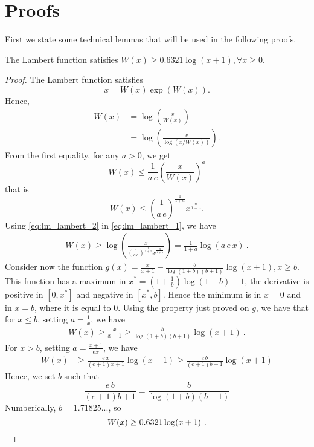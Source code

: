 \appendix
\section{Proofs}
\label{sec:proofs}

First we state some technical lemmas that will be used in the following proofs.

\begin{lemma}
The Lambert function satisfies $W(x) \geq 0.6321 \log(x+1), \forall x\geq0$.
\end{lemma}
\begin{proof}
The Lambert function satisfies
\[
x=W(x) \exp \left(W(x)\right).
\]
Hence,
\begin{align}
W(x) &= \log\left(\frac{x}{W(x)}\right) \label{eq:lm_lambert_1} \\
&= \log\left(\frac{x}{\log(x/W(x))}\right). \label{eq:lm_lambert_1b}
\end{align}
From the first equality, for any $a>0$, we get
\[
W(x) \leq \frac{1}{a\, e}\left(\frac{x}{W(x)}\right)^a
\]
that is
\begin{equation}
\label{eq:lm_lambert_2}
W(x) \leq \left(\frac{1}{a\, e}\right)^\frac{1}{1+a} x^\frac{a}{1+a}.
\end{equation}
Using \eqref{eq:lm_lambert_2} in \eqref{eq:lm_lambert_1}, we have
\begin{align*}
W(x) 
\geq \log\left(\frac{x}{\left(\frac{1}{a\, e}\right)^\frac{1}{1+a} x^\frac{a}{1+a}}\right) 
= \frac{1}{1+a}\log\left(a \, e\, x\right)~.
\end{align*}
Consider now the function $g(x)=\frac{x}{x+1} - \frac{b}{\log(1+b) (b+1)} \log(x+1), x\geq b$. This function has a maximum in $x^*=(1+\frac{1}{b}) \log(1+b)-1$, the derivative is positive in $[0,x^*]$ and negative in $[x^*,b]$. Hence the minimum is in $x=0$ and in $x=b$, where it is equal to $0$.
Using the property just proved on $g$, we have that for $x\leq b$, setting $a=\frac{1}{x}$, we have
\begin{align*}
W(x) 
\geq \frac{x}{x+1} \geq \frac{b}{\log(1+b) (b+1)} \log(x+1)~.
\end{align*}
For $x>b$, setting $a=\frac{x+1}{e x}$, we have
\begin{align}
W(x) 
&\geq \frac{e\,x}{(e+1) x + 1} \log(x+1) \geq \frac{e\,b}{(e+1) b + 1} \log(x+1)
\end{align}
Hence, we set $b$ such that 
\[
\frac{e\, b}{(e+1)b + 1} = \frac{b}{\log(1+b) (b+1)}
\]
Numberically, $b=1.71825...$, so
\[
W(x) \geq 0.6321 \log(x+1)~. \qedhere
\]
\end{proof}


